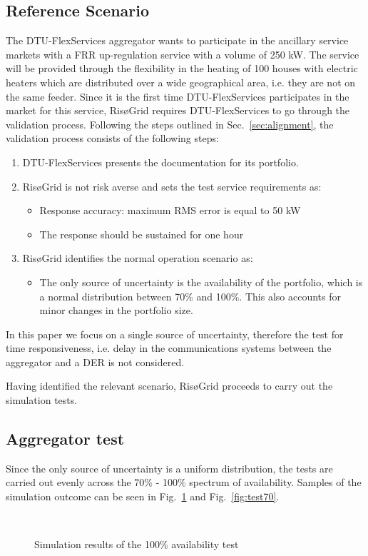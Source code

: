\subsection{Reference Scenario}
The DTU-FlexServices aggregator wants to participate in the ancillary service markets with a FRR up-regulation service with a volume of 250 kW. The service will be provided through the flexibility in the heating of 100 houses with electric heaters which are distributed over a wide geographical area, i.e. they are not on the same feeder. Since it is the first time DTU-FlexServices participates in the market for this service, RisøGrid requires DTU-FlexServices to go through the validation process. Following the steps outlined in Sec.~\ref{sec:alignment}, the validation process consists of the following steps:
\begin{enumerate}
\item DTU-FlexServices presents the documentation for its portfolio.
\item RisøGrid is not risk averse and sets the test service requirements as:
    \begin{itemize}
        \item Response accuracy: maximum RMS error is equal to 50 kW
        \item The response should be sustained for one hour
    \end{itemize}
\item RisøGrid identifies the normal operation scenario as:
    \begin{itemize}
        \item The only source of uncertainty is the availability of the portfolio, which is a normal distribution between 70\% and 100\%. This also accounts for minor changes in the portfolio size.
    \end{itemize}
\end{enumerate}

In this paper we focus on a single source of uncertainty, therefore the test for time responsiveness, i.e. delay in the communications systems between the aggregator and a DER is not considered.

Having identified the relevant scenario, RisøGrid proceeds to carry out the simulation tests.

\subsection{Aggregator test}
Since the only source of uncertainty is a uniform distribution, the tests are carried out evenly across the 70\% - 100\% spectrum of availability. Samples of the simulation outcome can be seen in Fig.~\ref{fig:test100} and Fig.~\ref{fig:test70}.
\begin{figure}[!t]
\centering
{}
\\
\caption{Simulation results of the 100\% availability test}
\label{fig:test100}
\end{figure}

